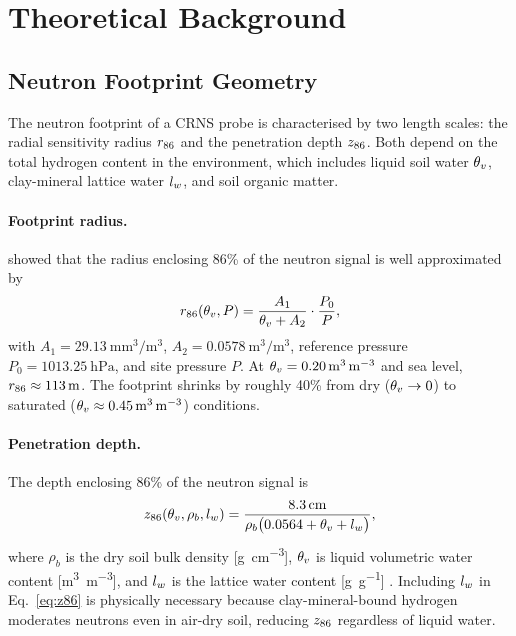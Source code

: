 \section{Theoretical Background}
\label{sec:theory}

\subsection{Neutron Footprint Geometry}

The neutron footprint of a CRNS probe is characterised by two
length scales: the radial sensitivity radius $r_{86}$ and the
penetration depth $z_{86}$.
Both depend on the total hydrogen content in the environment, which
includes liquid soil water $\theta_v$, clay-mineral lattice water $l_w$,
and soil organic matter.

\paragraph{Footprint radius.}
\citet{kohli2015} showed that the radius enclosing 86\% of the
neutron signal is well approximated by
\begin{equation}
  r_{86}(\theta_v, P) = \frac{A_1}{\theta_v + A_2} \cdot \frac{P_0}{P},
  \label{eq:r86}
\end{equation}
with $A_1 = \SI{29.13}{\metre\cubic\metre\per\cubic\metre}$,
$A_2 = \SI{0.0578}{\cubic\metre\per\cubic\metre}$, reference pressure
$P_0 = \SI{1013.25}{\hecto\pascal}$, and site pressure $P$.
At $\theta_v = \SI{0.20}{\cubic\metre\per\cubic\metre}$ and sea level,
$r_{86} \approx \SI{113}{\metre}$.
The footprint shrinks by roughly 40\% from dry ($\theta_v \to 0$) to
saturated ($\theta_v \approx \SI{0.45}{\cubic\metre\per\cubic\metre}$)
conditions.

\paragraph{Penetration depth.}
The depth enclosing 86\% of the neutron signal is
\begin{equation}
  z_{86}(\theta_v, \rho_b, l_w) =
    \frac{\SI{8.3}{\centi\metre}}
         {\rho_b \bigl(\num{0.0564} + \theta_v + l_w\bigr)},
  \label{eq:z86}
\end{equation}
where $\rho_b$ is the dry soil bulk density [\si{\gram\per\cubic\centi\metre}],
$\theta_v$ is liquid volumetric water content [\si{\cubic\metre\per\cubic\metre}],
and $l_w$ is the lattice water content [\si{\gram\per\gram}]
\citep{bogena2013, kohli2021}.
Including $l_w$ in Eq.~\eqref{eq:z86} is physically necessary because
clay-mineral-bound hydrogen moderates neutrons even in air-dry soil,
reducing $z_{86}$ regardless of liquid water.

